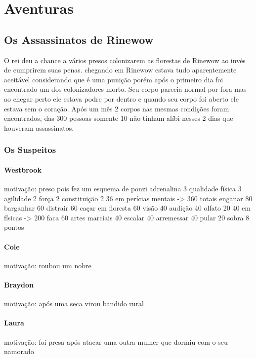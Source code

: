 \part{Aventuras}
\chapter{Os Assassinatos de Rinewow}
O rei deu a chance a vários presos colonizarem as florestas de Rinewow
ao invés de cumprirem suas penas.
chegando em Rinewow estava tudo aparentemente aceitável considerando que é uma punição
porém após o primeiro dia foi encontrado um dos colonizadores morto.
Seu corpo parecia normal por fora mas ao chegar perto ele estava podre por dentro e quando seu corpo foi aberto ele estava sem o coração.
Após um mês 2 corpos nas mesmas condições foram encontrados,
das 300 pessoas somente 10 não tinham alíbi
nesses 2 dias que houveram assassinatos.
% 
\section{Os Suspeitos}
\subsection{Westbrook}
motivação: preso pois fez um esquema de ponzi
adrenalina 3 qualidade física 3 agilidade 2  força 2 constituição 2 
36 em perícias mentais -> 360 totais
  enganar 80
  barganhar 60
  distrair 60
  caçar em floresta 60
  visão 40
  audição 40
  olfato 20
40 em físicas -> 200 
  faca 60
  artes marciais 40
  escalar 40
  arremessar 40
  pular 20
sobra 8 pontos
\subsection{Cole}
motivação: roubou um nobre
\subsection{Braydon}
motivação: após uma seca virou bandido rural 
\subsection{Laura}
motivação: foi presa após atacar uma outra mulher que dormiu com o seu namorado
